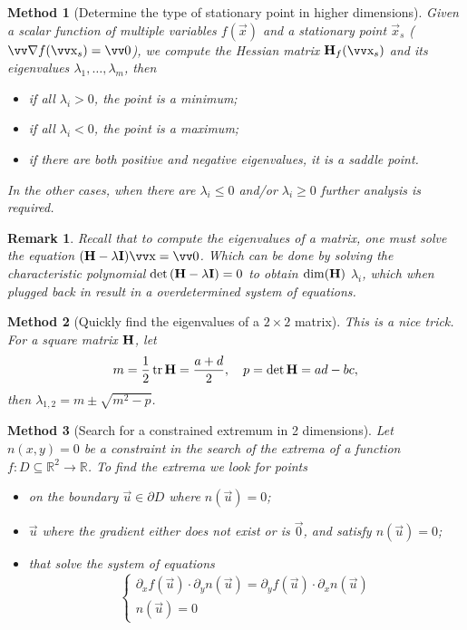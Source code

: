 \documentclass[twocolumn, margin=normal]{tex/hsrzf}
\theoremstyle{fuvarzf}
\newtheorem{method}{Method}
\newtheorem{remark}{Remark}
\DeclareMathOperator{\tr}{\mathrm{tr}}
\begin{document}
\begin{method}[Determine the type of stationary point in higher dimensions]
  Given a scalar function of multiple variables \(f(\vec{x})\) and a stationary
  point \(\vec{x}_s\) (\(\grad f(\vec{x}_s) = \vec{0}\)), we compute the
  Hessian matrix \(\mx{H}_f(\vec{x}_s)\) and its eigenvalues \(\lambda_1,
  \ldots, \lambda_m\), then
  \begin{itemize}
    \item if all \(\lambda_i > 0\), the point is a minimum;
    \item if all \(\lambda_i < 0\), the point is a maximum;
    \item if there are both positive and negative eigenvalues,
      it is a saddle point.
  \end{itemize}
  In the other cases, when there are \(\lambda_i \leq 0\) and/or \(\lambda_i
  \geq 0\) further analysis is required.
\end{method}

\begin{remark}
  Recall that to compute the eigenvalues of a matrix, one must solve the
  equation \((\mx{H} - \lambda\mx{I})\vec{x} = \vec{0}\). Which can be done
  by solving the characteristic polynomial \(\det\left(\bm{\mathrm{H}} -
  \lambda\bm{\mathrm{I}}\right) = 0\) to obtain \(\dim(\bm{\mathrm{H}})\) \(\lambda_i\), which
  when plugged back in result in a overdetermined system of equations.
\end{remark}

\begin{method}[Quickly find the eigenvalues of a \(2\times 2\) matrix]
  This is a nice trick. For a square matrix \(\bm{\mathrm{H}}\), let
  \[
    m = \frac{1}{2}\tr \mx{H} = \frac{a + d}{2} ,
    \quad
    p = \det\mx{H} = ad - bc ,
  \]
  then \(\lambda_{1,2} = m \pm \sqrt{m^2 - p}\).
\end{method}

\begin{method}[Search for a constrained extremum in 2 dimensions]
  Let \(n(x,y) = 0\) be a constraint in the search of the extrema of a function
  \(f: D \subseteq \mathbb{R}^2 \to \mathbb{R}\). To find the extrema we look for
  points
  \begin{itemize}
    \item on the boundary \(\vec{u} \in \partial D\)
      where \(n(\vec{u}) = 0\);

    \item \(\vec{u}\) where the gradient either does not exist or is
      \(\vec{0}\), and satisfy \(n(\vec{u}) = 0\);

    \item that solve the system of equations
      \[
        \begin{cases}
          \partial_x f(\vec{u}) \cdot \partial_y n(\vec{u})
            = \partial_y f(\vec{u}) \cdot \partial_x n(\vec{u}) \\
          n(\vec{u}) = 0
        \end{cases}
      \]
  \end{itemize}
\end{method}
\end{document}
